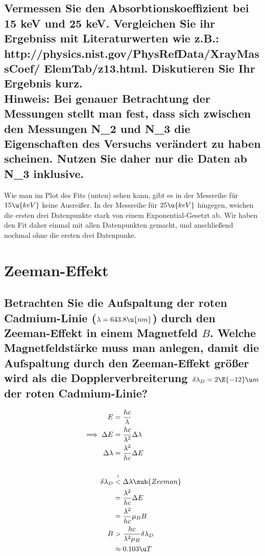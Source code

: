 \documentclass[ex, minted]{exercise_4.1}
\begin{document}
\begin{figure}[H]
    \centering
    
\end{figure}

\subsection{Vermessen Sie den Absorbtionskoeffizient bei 15 keV und 25 keV. Vergleichen Sie ihr Ergebniss mit Literaturwerten wie z.B.: http://physics.nist.gov/PhysRefData/XrayMassCoef/ ElemTab/z13.html.
Diskutieren Sie Ihr Ergebnis kurz.\\
Hinweis: Bei genauer Betrachtung der Messungen stellt man fest, dass sich zwischen den Messungen N\_2
und N\_3 die Eigenschaften des Versuchs verändert zu haben scheinen. Nutzen Sie daher nur die Daten
ab N\_3 inklusive.}

\dottedlinett

Wie man im Plot des Fits (unten) sehen kann, gibt es in der Messreihe für $15\u{keV}$ keine Ausreißer. In der Messreihe für \(25\u{keV}\) hingegen, weichen die ersten drei Datenpunkte stark von einem Exponential-Gesetzt ab. 
Wir haben den Fit daher einmal mit allen Datenpunkten gemacht, und anschließend nochmal ohne die ersten drei Datenpunke.\newpage


\begin{figure}[H]
    \centering
    
\end{figure}

\section{Zeeman-Effekt}
\subsection{Betrachten Sie die Aufspaltung der roten Cadmium-Linie ($\lambda = 643.8 \u{nm}$) durch den Zeeman-Effekt in
einem Magnetfeld \(B\). Welche Magnetfeldstärke muss man anlegen, damit die Aufspaltung durch den Zeeman-Effekt größer wird als die Dopplerverbreiterung $\delta\lambda_D = 2 \E{-12} \u m$ der roten Cadmium-Linie?}

\dottedlinete

\begin{align*}
    E &= \frac{hc}{\lambda}\\
    \implies \Delta E &= \frac{hc}{\lambda^2} \Delta \lambda\\
    \Delta \lambda &= \frac{\lambda^2}{hc} \Delta E\\
    \\
    \delta \lambda_D &\overset !< \Delta \lambda\sub{Zeeman}\\
    &=\frac{\lambda^2}{hc} \Delta E \\
    &=\frac{\lambda^2}{hc} \mu_B B \\
    B &> \frac{hc} {\lambda^2 \mu_B}\delta \lambda_D \\
    &\approx 0.103\u T\\
\end{align*}
\end{document}
